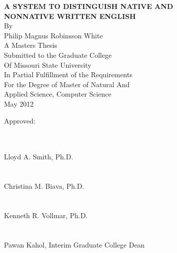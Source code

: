 \documentclass[main.tex]{subfiles}
\begin{document}
\centering

\textbf{A SYSTEM TO DISTINGUISH NATIVE AND\\NONNATIVE WRITTEN ENGLISH}\\
By\\
Philip Magnus Robinsson White\\
\null\null
\singlespacing
A Masters Thesis\\
Submitted to the Graduate College\\
Of Missouri State University\\
In Partial Fulfillment of the Requirements\\
For the Degree of Master of Natural And\\Applied Science, Computer Science\\
\null
May 2012\\
\null\null\null\null\null\null\null\null\null\null
\raggedleft
\begin{minipage}[t]{3.5in}
Approved:\\\\
\begin{flushright}
\begin{minipage}[b]{3.2in}
\makebox[3.2in]{\hrulefill}\\
Lloyd A. Smith, Ph.D.\\\\
\makebox[3.2in]{\hrulefill}\\
Christina M. Biava, Ph.D.\\\\
\makebox[3.2in]{\hrulefill}\\
Kenneth R. Vollmar, Ph.D.\\\\
\makebox[3.2in]{\hrulefill}\\
Pawan Kahol, Interim Graduate College Dean\\
\end{minipage}
\end{flushright}
\end{minipage}
\end{document}
